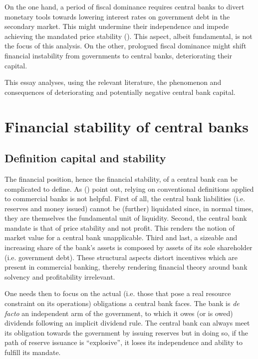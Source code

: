 \documentclass[american]{scrartcl}
\newcommand{\citein}[1]{\citeauthor{#1} (\citeyear{#1})}
\begin{document}
On the one hand, a period of fiscal dominance requires central banks to divert monetary tools towards lowering interest rates on government debt in the secondary market. This might undermine their independence and impede achieving the mandated price stability (\cite{Schnabel2020}). This aspect, albeit fundamental, is not the focus of this analysis. On the other, prologued fiscal dominance might shift financial instability from governments to central banks, deteriorating their capital. %

This essay analyses, using the relevant literature, the phenomenon and consequences of deteriorating and potentially negative central bank capital. %


\section{Financial stability of central banks}

\subsection{Definition capital and stability}

The financial position, hence the financial stability, of a central bank can be complicated to define. As \citein{Hall2015} point out, relying on conventional definitions applied to commercial banks is not helpful. First of all, the central bank liabilities (i.e. reserves and money issued) cannot be (further) liquidated since, in normal times, they are themselves the fundamental unit of liquidity. Second, the central bank mandate is that of price stability and not profit. This renders the notion of market value for a central bank unapplicable. Third and last, a sizeable and increasing share of the bank's assets is composed by assets of its sole shareholder (i.e. government debt). These structural aspects distort incentives which are present in commercial banking, thereby rendering financial theory around bank solvency and profitability irrelevant.

One needs then to focus on the actual (i.e. those that pose a real resource constraint on its operations) obligations a central bank faces. The bank is \textit{de facto} an independent arm of the government, to which it owes (or is owed) dividends following an implicit dividend rule. The central bank can always meet its obligation towards the government by issuing reserves but in doing so, if the path of reserve issuance is ``explosive'', it loses its independence and ability to fulfill its mandate. %
\end{document}
